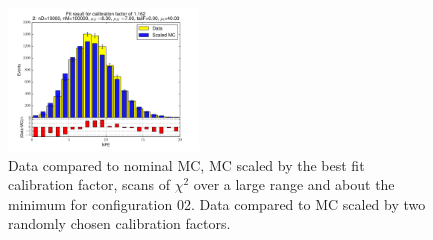 \begin{figure}[htbp]
\begin{center}
\includegraphics[width=0.45\textwidth]{../FIGURES/02/FIG_Fit_result_for_calibration_factor_of_1_162.pdf} 
\caption{Data compared to nominal MC, MC scaled by the best fit calibration factor, scans of $\chi^2$ over a large range and about the minimum for configuration 02. Data compared to MC scaled by two randomly chosen calibration factors.} 
\label{tab:best_02} 
\end{center} \end{figure} 

